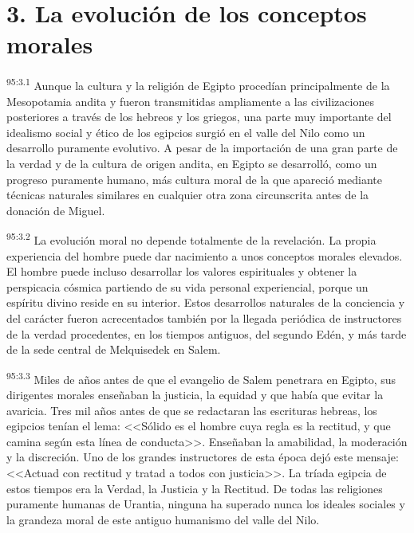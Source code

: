 \section*{3. La evolución de los conceptos morales}
\par
\textsuperscript{95:3.1} Aunque la cultura y la religión de Egipto procedían principalmente de la Mesopotamia andita y fueron transmitidas ampliamente a las civilizaciones posteriores a través de los hebreos y los griegos, una parte muy importante del idealismo social y ético de los egipcios surgió en el valle del Nilo como un desarrollo puramente evolutivo. A pesar de la importación de una gran parte de la verdad y de la cultura de origen andita, en Egipto se desarrolló, como un progreso puramente humano, más cultura moral de la que apareció mediante técnicas naturales similares en cualquier otra zona circunscrita antes de la donación de Miguel.

\par
\textsuperscript{95:3.2} La evolución moral no depende totalmente de la revelación. La propia experiencia del hombre puede dar nacimiento a unos conceptos morales elevados. El hombre puede incluso desarrollar los valores espirituales y obtener la perspicacia cósmica partiendo de su vida personal experiencial, porque un espíritu divino reside en su interior. Estos desarrollos naturales de la conciencia y del carácter fueron acrecentados también por la llegada periódica de instructores de la verdad procedentes, en los tiempos antiguos, del segundo Edén, y más tarde de la sede central de Melquisedek en Salem.

\par
\textsuperscript{95:3.3} Miles de años antes de que el evangelio de Salem penetrara en Egipto, sus dirigentes morales enseñaban la justicia, la equidad y que había que evitar la avaricia. Tres mil años antes de que se redactaran las escrituras hebreas, los egipcios tenían el lema: <<Sólido es el hombre cuya regla es la rectitud, y que camina según esta línea de conducta>>. Enseñaban la amabilidad, la moderación y la discreción. Uno de los grandes instructores de esta época dejó este mensaje: <<Actuad con rectitud y tratad a todos con justicia>>. La tríada egipcia de estos tiempos era la Verdad, la Justicia y la Rectitud. De todas las religiones puramente humanas de Urantia, ninguna ha superado nunca los ideales sociales y la grandeza moral de este antiguo humanismo del valle del Nilo.


